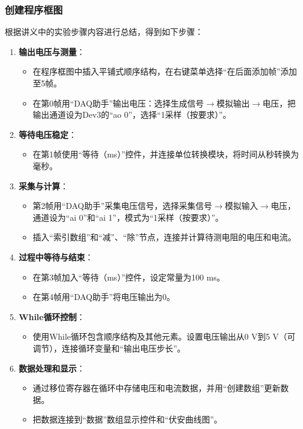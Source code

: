 \documentclass[UTF-8,twoside,cs4size]{ctexart}
\begin{document}
\subsubsection{创建程序框图}
根据讲义中的实验步骤内容进行总结，得到如下步骤：

\begin{enumerate}
    \item \textbf{输出电压与测量}：
    \begin{itemize}
        \item 在程序框图中插入平铺式顺序结构，在右键菜单选择“在后面添加帧”添加至5帧。
        \item 在第0帧用“DAQ助手”输出电压：选择生成信号$\rightarrow$模拟输出$\rightarrow$电压，把输出通道设为Dev3的“ao 0”，选择“1采样（按要求）”。
    \end{itemize}

    \item \textbf{等待电压稳定}：
    \begin{itemize}
        \item 在第1帧使用“等待（ms）”控件，并连接单位转换模块，将时间从秒转换为毫秒。
    \end{itemize}

    \item \textbf{采集与计算}：
    \begin{itemize}
        \item 第2帧用“DAQ助手”采集电压信号，选择采集信号$\rightarrow$模拟输入$\rightarrow$电压，通道设为“ai 0”和“ai 1”，模式为“1采样（按要求）”。
        \item 插入“索引数组”和“减”、“除”节点，连接并计算待测电阻的电压和电流。
    \end{itemize}

    \item \textbf{过程中等待与结束}：
    \begin{itemize}
        \item 在第3帧加入“等待（ms）”控件，设定常量为100 ms。
        \item 在第4帧用“DAQ助手”将电压输出为0。
    \end{itemize}

    \item \textbf{While循环控制}：
    \begin{itemize}
        \item 使用While循环包含顺序结构及其他元素。设置电压输出从0 V到5 V（可调节），连接循环变量和“输出电压步长”。
    \end{itemize}

    \item \textbf{数据处理和显示}：
    \begin{itemize}
        \item 通过移位寄存器在循环中存储电压和电流数据，并用“创建数组”更新数据。
        \item 把数据连接到“数据”数组显示控件和“伏安曲线图”。
    \end{itemize}


\end{enumerate}
\end{document}
